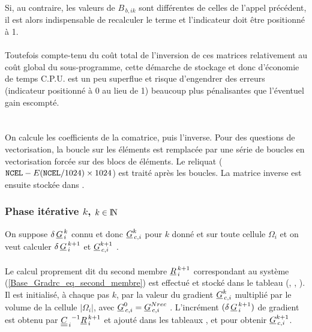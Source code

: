 {Si, au contraire, les valeurs de $B_{\,b,ik}$  sont diff\'erentes de celles de
l'appel pr\'ec\'edent, il est alors
indispensable de recalculer le terme et l'indicateur  doit \^etre
positionn\'e \`a 1.\\\\
Toutefois compte-tenu du co\^ut total de l'inversion de ces matrices relativement
au co\^ut global du sous-programme, cette d\'emarche de stockage et donc
d'\'economie de temps C.P.U. est un peu
superflue et risque d'engendrer des erreurs (indicateur 
positionn\'e \`a 0 au lieu de 1) beaucoup plus p\'enalisantes que l'\'eventuel
gain escompt\'e.\\\\
\hspace*{1,5cm}{\bf Inversion de la matrice}\\
On calcule les coefficients de la comatrice, puis l'inverse.
Pour des questions de vectorisation, la boucle sur les  \'el\'ements
est remplac\'ee par une
s\'erie de boucles en vectorisation forc\'ee sur des blocs de 
\'el\'ements. Le reliquat ($\text{\texttt{NCEL}}-E(\text{\texttt{NCEL}}/1024)\times 1024$) est
trait\'e apr\`es les boucles.
La matrice inverse est ensuite stock\'ee dans .\\
\hspace*{1cm}\subsubsection{\bf Phase it\'erative $k$, $k\in \mbox{I\hspace{-.15em}N}$}
On suppose  $\delta\,\underline{G}^{\,k}_{\,i}$ connu et donc  $\underline{G}^{k}_{\,c,i}$ pour $k$ donn\'e et sur
toute cellule $\Omega_{i}$ et on veut calculer
$\delta\,\underline{G}^{\,k+1}_{\,i}$ et $\underline{G}^{k+1}_{\,c,i}$ .\\

\\
Le calcul proprement dit du second membre ${\underline{R}^{\,k+1}_{\,i}} $
correspondant au syst\`eme (\ref{Base_Gradrc_eq_second_membre}) est effectu\'e et stock\'e
dans le tableau (, , ). Il est initialis\'e, \`a chaque
pas $k$, par la
valeur du gradient $\underline{G}^{k}_{\,c,i}$ multipli\'e par le
volume de la cellule $|\Omega_i|$, avec $\underline{G}^{0}_{\,c,i} = \underline{G}^{Nrec}_{\,c,i}$ . L'incr\'ement $(\delta\,\underline{G}^{\,k+1}_{\,i})$
de gradient est obtenu par $ {\underline{\underline{C}}_{\,i}}^{-1}{\underline{R}^{\,k+1}_{\,i}}$ et
ajout\'e dans les tableaux ,
 et  pour obtenir $\underline{G}^{k+1}_{\,c,i}$.\\

}
